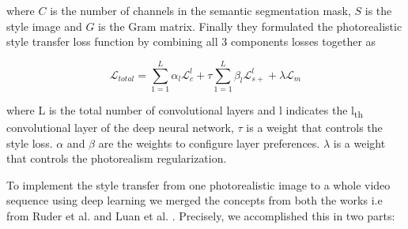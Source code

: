 \documentclass[runningheads]{llncs}
\begin{document}
where $C$ is the number of channels in the semantic segmentation mask, $S$ is the style image and $G$ is the Gram matrix. Finally they formulated the photorealistic style transfer loss function by combining all 3 components losses together as

\[ \mathcal{L}_{total} = \sum_{1=1}^L\alpha_l \mathcal{L}_c^l + \tau \sum_{1=1}^L\beta_l \mathcal{L}_{s+}^l + \lambda \mathcal{L}_m \]

where L is the total number of convolutional layers and l indicates the l\textsubscript{th} convolutional layer of the deep neural
network, $\tau$ is a weight that controls the style loss. $\alpha$ and
$\beta$ are the weights to configure layer preferences. $\lambda$ is a
weight that controls the photorealism regularization.

To implement the style transfer from one photorealistic image to a whole video sequence using deep learning we merged the concepts from both the works i.e from Ruder et al. \cite{10.1007/978-3-319-45886-1_3} and Luan et al. \cite{luan2017deep}. Precisely, we accomplished this in two parts: 
\end{document}
